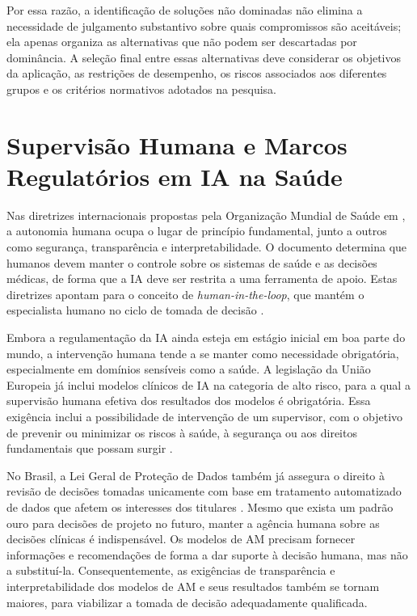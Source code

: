 Por essa razão, a identificação de soluções não dominadas não elimina
a necessidade de julgamento substantivo sobre quais compromissos são
aceitáveis; ela apenas organiza as alternativas que não podem ser
descartadas por dominância. A seleção final entre essas alternativas
deve considerar os objetivos da aplicação, as restrições de desempenho,
os riscos associados aos diferentes grupos e os critérios normativos
adotados na pesquisa.

\section{Supervisão Humana e Marcos Regulatórios em IA na Saúde}
\label{sec:supervisao_humana}

Nas diretrizes internacionais propostas pela Organização Mundial de Saúde em \citeyear{who2021ethics}, a autonomia humana ocupa o lugar de princípio fundamental, junto a outros como segurança, transparência e interpretabilidade. O documento determina que humanos devem manter o controle sobre os sistemas de saúde e as decisões médicas, de forma que a IA deve ser restrita a uma ferramenta de apoio. Estas diretrizes apontam para o conceito de \textit{human-in-the-loop}, que mantém o especialista humano no ciclo de tomada de decisão \cite{who2021ethics}.

Embora a regulamentação da IA ainda esteja em estágio inicial em boa parte do mundo, a intervenção humana tende a se manter como necessidade obrigatória, especialmente em domínios sensíveis como a saúde. A legislação da União Europeia já inclui modelos clínicos de IA na categoria de alto risco, para a qual a supervisão humana efetiva dos resultados dos modelos é obrigatória. Essa exigência inclui a possibilidade de intervenção de um supervisor, com o objetivo de prevenir ou minimizar os riscos à saúde, à segurança ou aos direitos fundamentais que possam surgir \cite{eu2024aiact}.

No Brasil, a Lei Geral de Proteção de Dados também já assegura o direito à revisão de decisões tomadas unicamente com base em tratamento automatizado de dados que afetem os interesses dos titulares \cite{brasil2018lgpd}. Mesmo que exista um padrão ouro para decisões de projeto no futuro, manter a agência humana sobre as decisões clínicas é indispensável. Os modelos de AM precisam fornecer informações e recomendações de forma a dar suporte à decisão humana, mas não a substituí-la. Consequentemente, as exigências de transparência e interpretabilidade dos modelos de AM e seus resultados também se tornam maiores, para viabilizar a tomada de decisão adequadamente qualificada.




